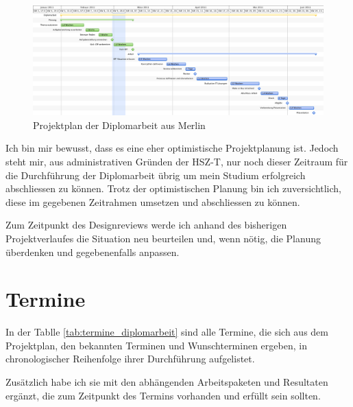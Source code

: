 \begin{figure}[htbp]
\begin{center}
\includegraphics[width=1\textwidth,angle=0]{./bilder/projektplanung.pdf}
\caption{Projektplan der Diplomarbeit aus Merlin}
\label{pic:projektplan}
\end{center}
\end{figure}

Ich bin mir bewusst, dass es eine eher optimistische Projektplanung ist. Jedoch
steht mir, aus administrativen Gründen der HSZ-T, nur noch dieser Zeitraum für
die Durchführung der Diplomarbeit übrig um mein Studium erfolgreich abschliessen
zu können. Trotz der optimistischen Planung bin ich zuversichtlich, diese
im gegebenen Zeitrahmen umsetzen und abschliessen zu können.

Zum Zeitpunkt des Designreviews werde ich anhand des bisherigen Projektverlaufes
die Situation neu beurteilen und, wenn nötig, die Planung überdenken und 
gegebenenfalls anpassen.

\section{Termine}
In der Tablle \ref{tab:termine_diplomarbeit} sind alle Termine, die sich aus 
dem Projektplan, den bekannten Terminen und Wunschterminen ergeben, in chronologischer
Reihenfolge ihrer Durchführung aufgelistet.

Zusätzlich habe ich sie mit den abhängenden Arbeitspaketen
und Resultaten ergänzt, die zum Zeitpunkt des Termins vorhanden und erfüllt
sein sollten.

